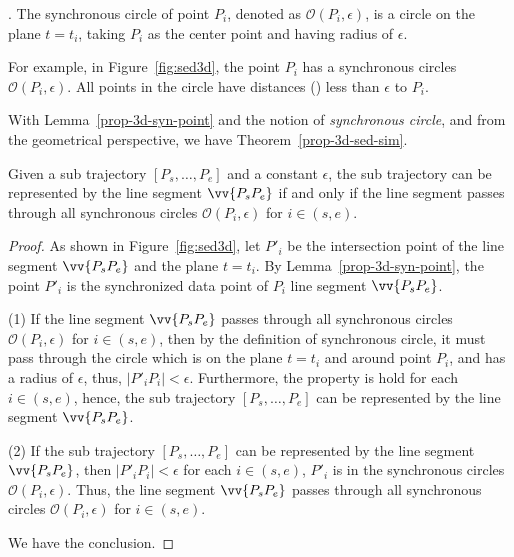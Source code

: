 . The synchronous circle of point $P_i$, denoted as $\mathcal{O}(P_i, \epsilon)$, is a circle on the plane $t=t_i$, taking $P_i$ as the center point and having radius of $\epsilon$. %

For example, in Figure~\ref{fig:sed3d}, the point $P_i$ has a synchronous circles $\mathcal{O}(P_i, \epsilon)$. All points in the circle have distances (\ie \sed) less than $\epsilon$ to $P_i$.

With Lemma~\ref{prop-3d-syn-point} and the notion of \emph{synchronous circle}, and from the geometrical perspective, we have Theorem~\ref{prop-3d-sed-sim}.

\begin{theorem}
\label{prop-3d-sed-sim}
Given a sub trajectory $[P_s, \ldots, P_e]$ and a constant $\epsilon$, the sub trajectory can be represented by the line segment $\vv{P_sP_e}$ if and only if the line segment passes through all synchronous circles $\mathcal{O}(P_i, \epsilon)$ for $i \in (s, e)$.
\end{theorem}

\begin{proof}
As shown in Figure~\ref{fig:sed3d}, let $P'_i$ be the intersection point of the line segment $\vv{P_sP_e}$ and the plane $t=t_i$.
By Lemma~\ref{prop-3d-syn-point}, the point $P'_i$ is the synchronized data point of $P_i$ \wrt line segment $\vv{P_sP_e}$.

(1) If the line segment $\vv{P_sP_e}$ passes through all synchronous circles $\mathcal{O}(P_i, \epsilon)$ for $i \in (s, e)$, then by the definition of synchronous circle, it must pass through the circle which is on the plane $t=t_i$ and around point $P_i$, and has a radius of $\epsilon$, thus, $|P'_iP_i| <\epsilon$. Furthermore, the property is hold for each $i \in (s, e)$, hence, the sub trajectory $[P_s, \ldots, P_e]$ can be represented by the line segment $\vv{P_sP_e}$.

(2) If the sub trajectory $[P_s, \ldots, P_e]$ can be represented by the line segment $\vv{P_sP_e}$, then $|P'_iP_i| <\epsilon$ for each $i \in (s, e)$, \ie $P'_i$ is in the synchronous circles $\mathcal{O}(P_i, \epsilon)$. Thus, the line segment $\vv{P_sP_e}$ passes through all synchronous circles $\mathcal{O}(P_i, \epsilon)$ for $i \in (s, e)$.

We have the conclusion.
\end{proof}


